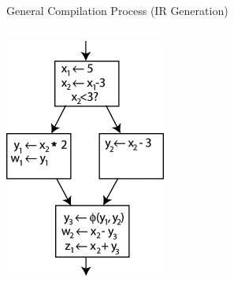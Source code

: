 \documentclass{beamer}
\begin{document}
\begin{frame}[fragile]{General Compilation Process (IR Generation)}
\begin{columns}[T,onlytextwidth]
            \includegraphics[width=\linewidth]{images/ssa3.png}
        \endminipage\hfill
        \cite{ssa}
\end{columns}
\end{frame}
\end{document}
